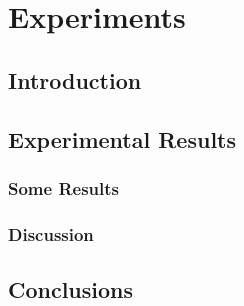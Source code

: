 \chapter{Experiments}
\label{ch6:Experiments}

\section{Introduction}
\label{ch6:sec:Introduction}

\section{Experimental Results}
\label{ch6:sec:Experimental Results}

\subsection{Some Results}
\label{ch6:subsec:Some Results}

\subsection{Discussion}
\label{ch6:subsec:Discussion}

\section{Conclusions}
\label{ch6:sec:Conclusions}